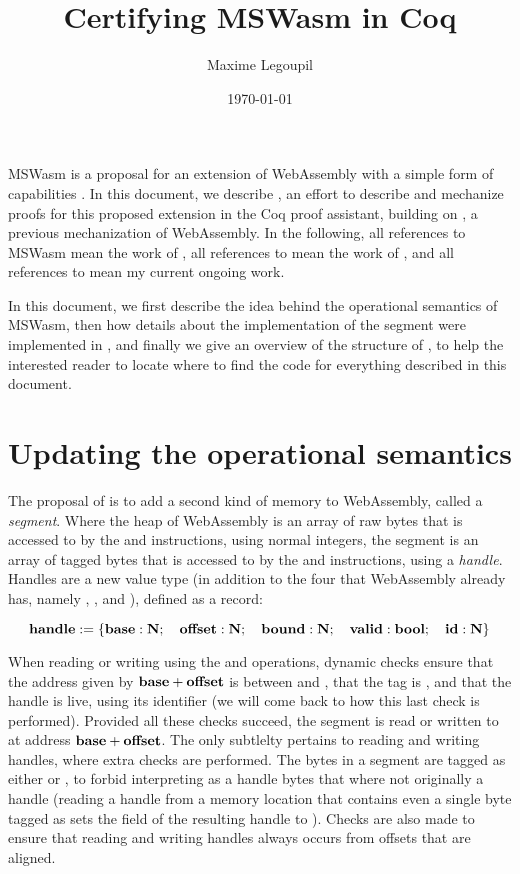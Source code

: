\documentclass[a4paper]{article}
\author{Maxime Legoupil}
\title{Certifying MSWasm in Coq}
\date{\today}
\begin{document}
\maketitle

MSWasm \cite{mswasm} is a proposal for an extension of WebAssembly \cite{wasm} with
a simple form of capabilities \cite{capabilities}. In this document, we describe \irismswasm,
an effort to describe and mechanize proofs for this proposed extension in the Coq proof assistant,
building on \iriswasm \cite{iriswasm}, a previous mechanization of WebAssembly. In the following, all references to MSWasm mean the work of \citet{mswasm}, all references to \iriswasm mean the work of \citet{iriswasm}, and all references to \irismswasm mean my current ongoing work.

In this document, we first describe the idea behind the operational semantics of MSWasm, then how details about the implementation of the segment were implemented in \irismswasm, and finally we give an overview of the structure of \irismswasm, to help the interested reader to locate where to find the code for everything described in this document.

\section{Updating the operational semantics}

The proposal of \citet{mswasm} is to add a second kind of memory to WebAssembly, called
a \emph{segment}. Where the heap of WebAssembly is an array of raw bytes that is accessed to by
the \xxWload and \xxWstore instructions, using normal \xxWithirtytwo integers, the segment
is an array of tagged bytes that is accessed to by the \xxWsegload and \xxWsegstore instructions,
using a \emph{handle}. Handles are a new value type (in addition to the four that WebAssembly
already has, namely \xxWithirtytwo, \xxWisixtyfour, \xxWfthirtytwo and \xxWfsixtyfour),
defined as a record:

\[ \mathbf{handle} := \{ \mathbf{base} : \mathbf{N}; \quad \mathbf{offset} : \mathbf{N};\quad \mathbf{bound} : \mathbf{N};\quad \mathbf{valid} : \mathbf{bool};\quad \mathbf{id} : \mathbf{N} \} \]

When reading or writing using the \xxWsegload and \xxWsegstore operations, dynamic checks ensure that the address given by \( \mathbf{base} + \mathbf{offset} \) is between \xxWbase and \xxWbound, that the \xxWvalid tag is \xxCtrue, and that the handle is live, using its identifier \xxWid (we will come back to how this last check is performed).
Provided all these checks succeed, the segment is read or written to at address \( \mathbf{base} + \mathbf{offset} \). The only subtlelty pertains to reading and writing handles, where extra checks are performed. The bytes in a segment are tagged as either \xxWNumeric or \xxWHandle, to forbid interpreting as a handle bytes that where not originally a handle (reading a handle from a memory location that contains even a single byte tagged as \xxWNumeric sets the \xxWvalid field of the resulting handle to \xxCfalse). Checks are also made to ensure that reading and writing handles always occurs from offsets that are aligned.
\end{document}
